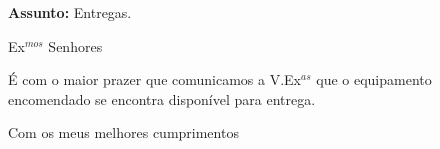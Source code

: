 \documentclass[12pt]{letter}
\begin{document}
 
\begin{letter}{{\bf Assunto:} Entregas.}
\opening{Ex$^{mos}$ Senhores}

É com o maior prazer que comunicamos a V.Ex$^{as}$ que o
equipamento encomendado se encontra disponível para entrega.

\closing{Com os meus melhores cumprimentos}
\end{letter}
\end{document}
